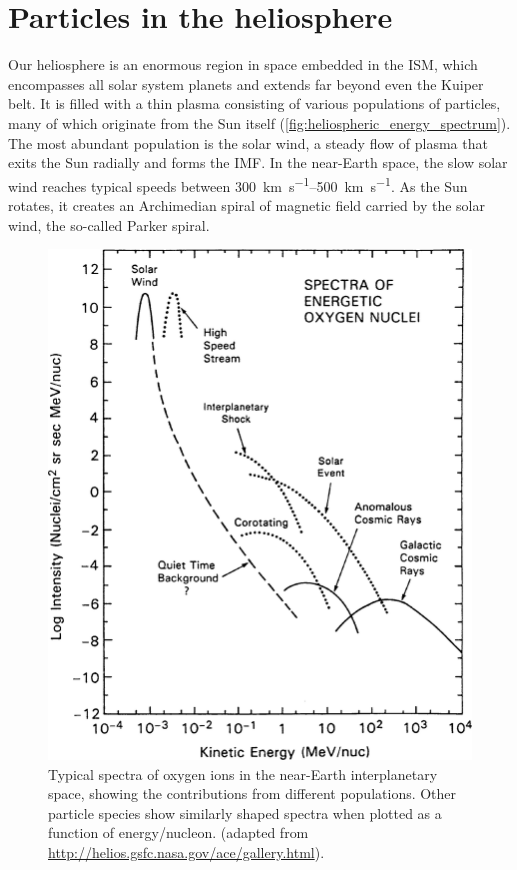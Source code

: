 \section{Particles in the heliosphere}

Our heliosphere is an enormous region in space embedded in the \ac{ISM}, which encompasses all solar system planets and extends far beyond even the Kuiper belt. 
It is filled with a thin plasma consisting of various populations of particles, many of which originate from the Sun itself (\autoref{fig:heliospheric_energy_spectrum}). 
The most abundant population is the solar wind, a steady flow of plasma that exits the Sun radially and forms the \ac{IMF}. 
In the near-Earth space, the slow solar wind reaches typical speeds between \SIrange[range-phrase={\,and\,}]{300}{500}{\kilo\meter\per\second}.
As the Sun rotates, it creates an Archimedian spiral of magnetic field carried by the solar wind, the so-called Parker spiral.

\begin{figure}
    \centering
    \includegraphics[width=0.6\linewidth]{images/heliospheric_energy_spectrum}
    \caption[Spectra of oxygen ions in the near-Earth interplanetary space]{Typical spectra of oxygen ions in the near-Earth interplanetary space, showing the contributions from different populations. Other particle species show similarly shaped spectra when plotted as a function of energy/nucleon. (adapted from \url{http://helios.gsfc.nasa.gov/ace/gallery.html}).}
    \label{fig:heliospheric_energy_spectrum}
\end{figure}


